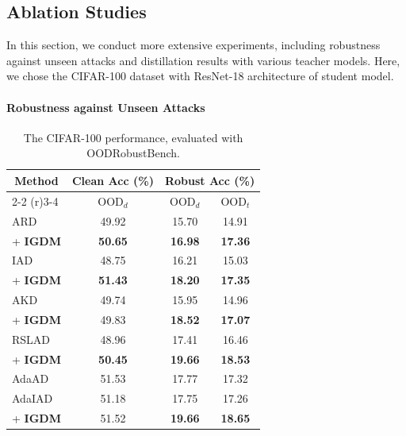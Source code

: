 \documentclass{article} %
\begin{document}
\subsection{Ablation Studies}
In this section, we conduct more extensive experiments, including robustness against unseen attacks and distillation results with various teacher models.
Here, we chose the CIFAR-100 dataset with ResNet-18 architecture of student model.


 
\paragraph{Robustness against Unseen Attacks}
\begin{table}
 \centering
 \vspace{-0.4cm}
 \caption{The CIFAR-100 performance, evaluated with OODRobustBench.}
    \setlength{\tabcolsep}{3pt}
 \begin{tabular}{lccc}
  \toprule
\multicolumn{1}{c}{\multirow{2}{*}{Method}} &Clean Acc (\%)&\multicolumn{2}{c}{Robust Acc (\%)}\\ 
\cmidrule(r){2-2} 
\cmidrule(r){3-4} 
& \multicolumn{1}{c}{$\text{OOD}_d$} & $\text{OOD}_d$ & $\text{OOD}_t$ \\
\midrule
 ARD & 49.92 & 15.70 & 14.91 \\
 + \textbf{IGDM} & \textbf{50.65} & \textbf{16.98} & \textbf{17.36} \\
 \midrule
 IAD & 48.75 & 16.21 & 15.03 \\
 + \textbf{IGDM} & \textbf{51.43} & \textbf{18.20} & \textbf{17.35} \\
  \midrule
 AKD & 49.74 & 15.95 & 14.96 \\
 + \textbf{IGDM} & 49.83 & \textbf{18.52} & \textbf{17.07} \\
   \midrule
  RSLAD & 48.96 & 17.41 & 16.46 \\
 + \textbf{IGDM} & \textbf{50.45} & \textbf{19.66} & \textbf{18.53} \\
   \midrule
   AdaAD & 51.53 & 17.77 & 17.32 \\
  AdaIAD & 51.18  & 17.75 & 17.26 \\
   +  \textbf{IGDM} & 51.52  & \textbf{19.66} & \textbf{18.65} \\
 \bottomrule
 \end{tabular}
 \label{tab:unseen attack}
\end{table}
\end{document}
